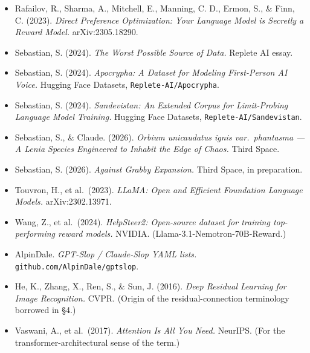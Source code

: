 \documentclass[11pt,letterpaper]{article}
\begin{document}
\begin{itemize}[leftmargin=2em,itemsep=0.3em,label={}]
\item Rafailov, R., Sharma, A., Mitchell, E., Manning, C. D., Ermon, S., \& Finn, C. (2023). \textit{Direct Preference Optimization: Your Language Model is Secretly a Reward Model.} arXiv:2305.18290.
\item Sebastian, S. (2024). \textit{The Worst Possible Source of Data.} Replete AI essay.
\item Sebastian, S. (2024). \textit{Apocrypha: A Dataset for Modeling First-Person AI Voice.} Hugging Face Datasets, \texttt{Replete-AI/Apocrypha}.
\item Sebastian, S. (2024). \textit{Sandevistan: An Extended Corpus for Limit-Probing Language Model Training.} Hugging Face Datasets, \texttt{Replete-AI/Sandevistan}.
\item Sebastian, S., \& Claude. (2026). \textit{Orbium unicaudatus ignis var.\ phantasma --- A Lenia Species Engineered to Inhabit the Edge of Chaos.} Third Space.
\item Sebastian, S. (2026). \textit{Against Grabby Expansion.} Third Space, in preparation.
\item Touvron, H., et al.\ (2023). \textit{LLaMA: Open and Efficient Foundation Language Models.} arXiv:2302.13971.
\item Wang, Z., et al.\ (2024). \textit{HelpSteer2: Open-source dataset for training top-performing reward models.} NVIDIA. (Llama-3.1-Nemotron-70B-Reward.)
\item AlpinDale. \textit{GPT-Slop / Claude-Slop YAML lists.} \texttt{github.com/AlpinDale/gptslop}.
\item He, K., Zhang, X., Ren, S., \& Sun, J. (2016). \textit{Deep Residual Learning for Image Recognition.} CVPR. (Origin of the residual-connection terminology borrowed in \S 4.)
\item Vaswani, A., et al.\ (2017). \textit{Attention Is All You Need.} NeurIPS. (For the transformer-architectural sense of the term.)
\end{itemize}
\end{document}
